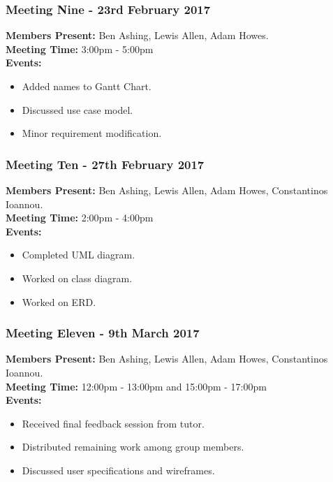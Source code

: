 \documentclass[a4paper]{article}
\begin{document}
\subsubsection*{Meeting Nine - 23rd February 2017}
\textbf{Members Present:} Ben Ashing, Lewis Allen, Adam Howes. \\
\textbf{Meeting Time:} 3:00pm - 5:00pm \\
\textbf{Events:} 
\begin{itemize}
    \item Added names to Gantt Chart.
    \item Discussed use case model.
    \item Minor requirement modification.
\end{itemize}

\subsubsection*{Meeting Ten - 27th February 2017}
\textbf{Members Present:} Ben Ashing, Lewis Allen, Adam Howes, Constantinos Ioannou. \\
\textbf{Meeting Time:} 2:00pm - 4:00pm \\
\textbf{Events:} 
\begin{itemize}
    \item Completed UML diagram.
    \item Worked on class diagram.
    \item Worked on ERD.
\end{itemize}

\subsubsection*{Meeting Eleven - 9th March 2017}
\textbf{Members Present:} Ben Ashing, Lewis Allen, Adam Howes, Constantinos Ioannou. \\
\textbf{Meeting Time:} 12:00pm - 13:00pm and 15:00pm - 17:00pm \\
\textbf{Events:} 
\begin{itemize}
    \item Received final feedback session from tutor.
    \item Distributed remaining work among group members.
    \item Discussed user specifications and wireframes.
\end{itemize}
\end{document}
